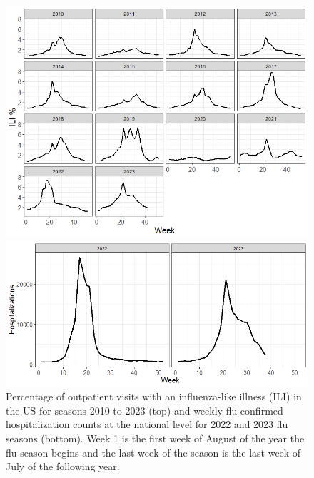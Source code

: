\begin{figure}[hbt!]
    \centering
    \includegraphics[scale=.5]{Images/us_ili_seasons.png}
    
    \centering
    \includegraphics[scale=.4]{Images/us_hospitalizations.png}
    \caption{Percentage of outpatient visits with an influenza-like illness 
    (ILI) in the US for seasons 2010 to 2023 (top) and weekly flu confirmed 
    hospitalization counts at the national level for 2022 and 2023 flu seasons 
    (bottom). Week 1 is the first week of August of the year the flu season 
    begins and the last week of the season is the last week of July of the 
    following year.}
    \label{fig:us_ili}
\end{figure}

